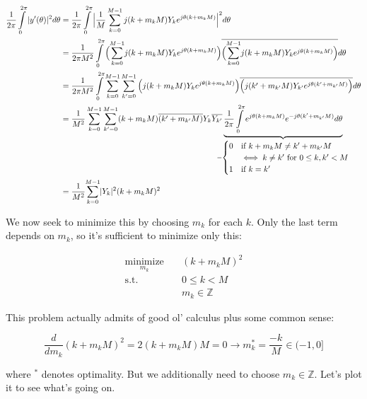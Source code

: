 \documentclass[10pt]{article}
\begin{document}
\begin{align*}
\frac{1}{2\pi} \int\limits_{0}^{2\pi} |y'(\theta)|^2 d\theta &= \frac{1}{2\pi} \int\limits_{0}^{2\pi} \Big|\frac{1}{M} \sum_{k=0}^{M-1} j(k + m_k M) Y_k e^{j \theta (k + m_k M)} \Big|^2 d\theta \\
&= \frac{1}{2\pi M^2} \int\limits_{0}^{2\pi} \Big( \sum_{k=0}^{\mathclap{M-1}} j(k + m_k M) Y_k e^{j \theta (k + m_k M)} \Big) \overline{\Big( \sum_{k=0}^{\mathclap{M-1}} j(k + m_k M) Y_k e^{j \theta (k + m_k M)} \Big)} d\theta \\
&= \frac{1}{2\pi M^2} \int\limits_{0}^{2\pi} \sum_{k=0}^{M-1} \sum_{k'=0}^{M-1} \Big( j(k + m_k M) Y_k e^{j \theta (k + m_k M)} \Big) \overline{\Big( j(k' + m_{k'} M) Y_{k'} e^{j \theta (k' + m_{k'} M)} \Big)} d\theta \\
&= \frac{1}{M^2} \sum_{k=0}^{M-1} \sum_{k'=0}^{M-1} (k + m_k M) \overline{(k' + m_{k'} M)} Y_k \overline{Y_{k'}} \underbrace{\frac{1}{2\pi} \int\limits_{0}^{2\pi} e^{j \theta (k + m_k M)} e^{-j \theta (k' + m_{k'} M)} d\theta}_{\mathclap{= \begin{cases} 0 & \text{if } k + m_k M \neq k' + m_{k'} M \\ & \iff k \neq k' \text{ for } 0 \leq k, k' < M \\ 1 & \text{if } k = k'\end{cases}}} \\
&= \frac{1}{M^2} \sum_{k=0}^{\mathclap{M-1}} |Y_k|^2 (k + m_k M)^2
\end{align*}

We now seek to minimize this by choosing $m_k$ for each $k$. Only the last term depends on $m_k$, so it's sufficient to minimize only this:\vspace{-5mm}

\begin{align*}
\underset{m_k}{\text{minimize}} \quad & (k + m_k M)^2 \\
\text{s.t.} \quad & 0 \leq k < M \\
	& m_k \in \mathbb{Z}
\end{align*}

This problem actually admits of good ol' calculus plus some common sense:

$$\frac{d}{dm_k} (k + m_k M)^2 = 2(k + m_k M)M = 0 \longrightarrow m_k^* = \frac{-k}{M} \in (-1, 0]$$\vspace{0mm}

where $^*$ denotes optimality. But we additionally need to choose $m_k \in \mathbb{Z}$. Let's plot it to see what's going on.
\end{document}
